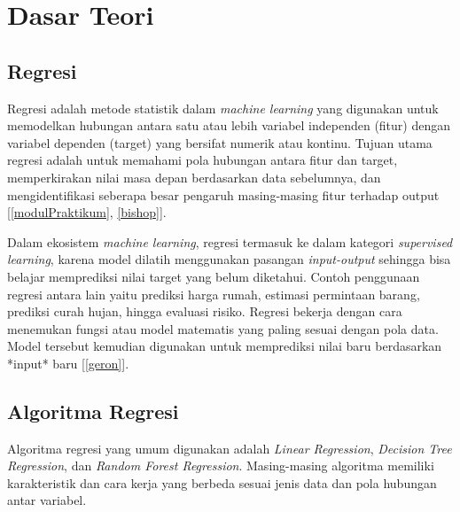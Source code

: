 \chapter{Dasar Teori}

\section{Regresi}
Regresi adalah metode statistik dalam \textit{machine learning} yang digunakan untuk memodelkan hubungan antara satu atau lebih variabel independen (fitur) dengan variabel dependen (target) yang bersifat numerik atau kontinu. Tujuan utama regresi adalah untuk memahami pola hubungan antara fitur dan target, memperkirakan nilai masa depan berdasarkan data sebelumnya, dan mengidentifikasi seberapa besar pengaruh masing-masing fitur terhadap output [\ref{modulPraktikum}, \ref{bishop}].

Dalam ekosistem \textit{machine learning}, regresi termasuk ke dalam kategori \textit{supervised learning}, karena model dilatih menggunakan pasangan \textit{input-output} sehingga bisa belajar memprediksi nilai target yang belum diketahui. Contoh penggunaan regresi antara lain yaitu prediksi harga rumah, estimasi permintaan barang, prediksi curah hujan, hingga evaluasi risiko. Regresi bekerja dengan cara menemukan fungsi atau model matematis yang paling sesuai dengan pola data. Model tersebut kemudian digunakan untuk memprediksi nilai baru berdasarkan *input* baru [\ref{geron}].

\section{Algoritma Regresi}
Algoritma regresi yang umum digunakan adalah \textit{Linear Regression}, \textit{Decision Tree Regression}, dan \textit{Random Forest Regression}. Masing-masing algoritma memiliki karakteristik dan cara kerja yang berbeda sesuai jenis data dan pola hubungan antar variabel.

